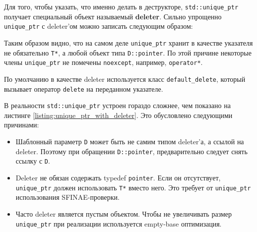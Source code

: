 Для того, чтобы указать, что именно делать в деструкторе, \texttt{std::unique_ptr} получает специальный объект называемый {\bf deleter}. Сильно упрощенно \texttt{unique_ptr} с deleter'ом можно записать следующим образом:

Таким образом видно, что на самом деле \texttt{unique_ptr} хранит в качестве указателя не обязательно \texttt{T*}, а любой объект типа \texttt{D::pointer}. По этой причине некоторые члены \texttt{unique_ptr} не помечены \texttt{noexcept}, например, \texttt{operator*}.

По умолчанию в качестве deleter используется класс \texttt{default_delete}, который вызывает оператор \texttt{delete} на переданном указателе.

В реальности \texttt{std::unique_ptr} устроен гораздо сложнее, чем показано на листинге \ref{listing:unique_ptr_with_deleter}. Это обусловлено следующими причинами:

\begin{itemize}
    \item Шаблонный параметр \texttt{D} может быть не самим типом deleter'а, а ссылой на deleter. Поэтому при обращении \texttt{D::pointer}, предварительно следует снять ссылку с \texttt{D}.
    \item Deleter не обязан содержать typedef \texttt{pointer}. Если он отсутствует, \texttt{unique_ptr} должен использовать \texttt{T*} вместо него. Это требует от \texttt{unique_ptr} использования SFINAE-проверки.
    \item Часто deleter является пустым объектом. Чтобы не увеличивать размер \texttt{unique_ptr} при реализации используется empty-base оптимизация.
\end{itemize}

